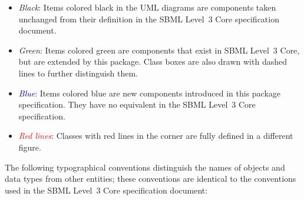 \begin{itemize}

\item[\raisebox{2.75pt}{\colorbox{black}{\rule{0.8pt}{0.8pt}}}]
  \emph{Black}: Items colored black in the UML diagrams are components
  taken unchanged from their definition in the SBML Level~3 Core
  specification document.

\item[\raisebox{2.75pt}{\colorbox{mediumgreen}{\rule{0.8pt}{0.8pt}}}]
  \emph{\textcolor{mediumgreen}{Green}}: Items colored green are
  components that exist in SBML Level~3 Core, but are extended by this
  package.  Class boxes are also drawn with dashed lines to further
  distinguish them.

\item[\raisebox{2.75pt}{\colorbox{darkblue}{\rule{0.8pt}{0.8pt}}}]
  \emph{\textcolor{darkblue}{Blue}}: Items colored blue are new
  components introduced in this package specification.  They have no
  equivalent in the SBML Level~3 Core specification.

\item[\raisebox{2.75pt}{\colorbox{red}{\rule{0.8pt}{0.8pt}}}]
  \emph{\textcolor{red}{Red lines}}: Classes with red lines in the corner are fully defined in a different figure.

\end{itemize}

The following typographical conventions distinguish the names of objects and data types from other entities; these conventions are identical to the conventions used in the SBML Level~3 Core specification document:

